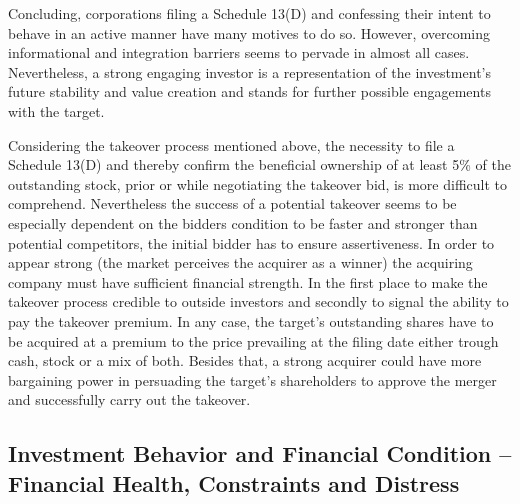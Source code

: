 \documentclass[12pt]{article}
\begin{document}
Concluding, corporations filing a Schedule 13(D) and confessing their intent to behave in an active manner have many motives to do so. However, overcoming informational and integration barriers seems to pervade in almost all cases. Nevertheless, a strong engaging investor is a representation of the investment's future stability and value creation and stands for further possible engagements with the target. 

Considering the takeover process mentioned above, the necessity to file a Schedule 13(D) and thereby confirm the beneficial ownership of at least 5\% of the outstanding stock, prior or while negotiating the takeover bid, is more difficult to comprehend. Nevertheless the success of a potential takeover seems to be especially dependent on the bidders condition to be faster and stronger than potential competitors, the initial bidder has to ensure assertiveness. In order to appear strong (the market perceives the acquirer as a winner) the acquiring company must have sufficient financial strength. In the first place to make the takeover process credible to outside investors and secondly to signal the ability to pay the takeover premium. In any case, the target's outstanding shares have to be acquired at a premium to the price prevailing at the filing date either trough cash, stock or a mix of both. Besides that, a strong acquirer could have more bargaining power in persuading the target's shareholders to approve the merger and successfully carry out the takeover. 

\subsection{Investment Behavior and Financial Condition -- Financial Health, Constraints and Distress}

\end{document}
